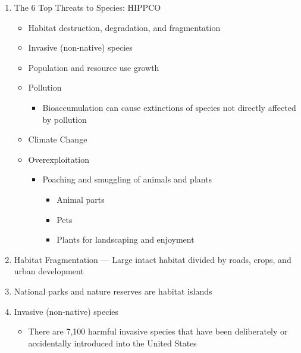 \documentclass[12pt]{article}
\begin{document}
\begin{enumerate}
  \item The 6 Top Threats to Species: HIPPCO

    \begin{itemize}

      \item Habitat destruction, degradation, and fragmentation

      \item Invasive (non-native) species

      \item Population and resource use growth

      \item Pollution

        \begin{itemize}

          \item Bioaccumulation can cause extinctions of species not directly affected by pollution

        \end{itemize}

      \item Climate Change

      \item Overexploitation

        \begin{itemize}

          \item Poaching and smuggling of animals and plants

            \begin{itemize}

              \item Animal parts

              \item Pets

              \item Plants for landscaping and enjoyment

            \end{itemize}

        \end{itemize}

    \end{itemize}

  \item Habitat Fragmentation — Large intact habitat divided by roads, crops, and urban development

  \item National parks and nature reserves are habitat islands

  \item Invasive (non-native) species

    \begin{itemize}

      \item There are 7,100 harmful invasive species that have been deliberately or accidentally introduced into the United States

    \end{itemize}

\end{enumerate}
\end{document}
